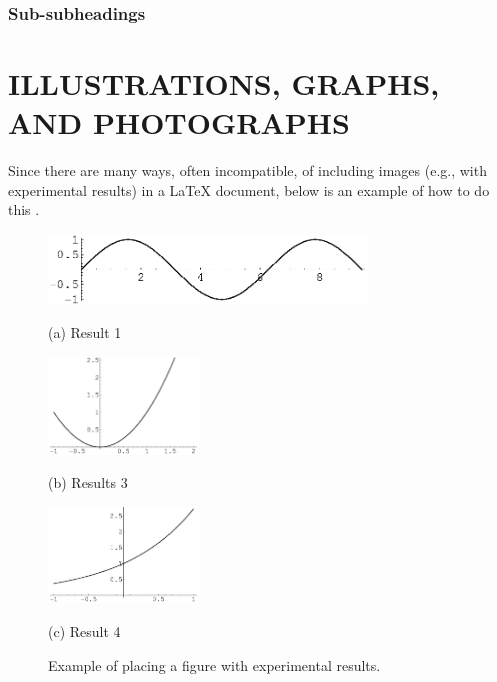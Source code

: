 \documentclass{article}
\begin{document}
\subsubsection{Sub-subheadings}
\label{sssec:subsubhead}


\section{ILLUSTRATIONS, GRAPHS, AND PHOTOGRAPHS}
\label{sec:illust}

Since there are many ways, often incompatible, of including images (e.g., with
experimental results) in a LaTeX document, below is an example of how to do
this \cite{Lamp86}.

\begin{figure}[htb]

\begin{minipage}[b]{1.0\linewidth}
  \centering
  \centerline{\includegraphics[width=8.5cm]{image1}}
  \centerline{(a) Result 1}\medskip
\end{minipage}
%
\begin{minipage}[b]{.48\linewidth}
  \centering
  \centerline{\includegraphics[width=4.0cm]{image3}}
  \centerline{(b) Results 3}\medskip
\end{minipage}
\hfill
\begin{minipage}[b]{0.48\linewidth}
  \centering
  \centerline{\includegraphics[width=4.0cm]{image4}}
  \centerline{(c) Result 4}\medskip
\end{minipage}
%
\caption{Example of placing a figure with experimental results.}
\label{fig:res}
%
\end{figure}
\end{document}

